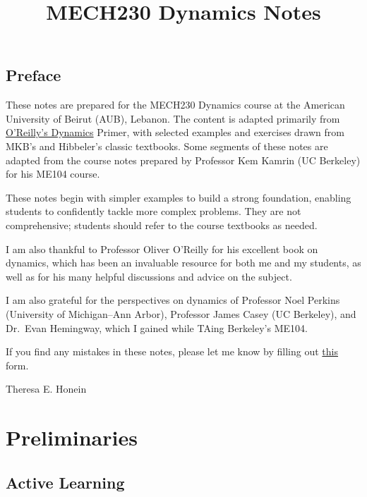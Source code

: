 \documentclass[
  letterpaper,
  DIV=11,
  numbers=noendperiod]{scrreprt}
\title{MECH230 Dynamics Notes}
\author{}
\date{}
\renewcommand*\contentsname{Table of contents}
\newcommand\contentsname{Table of contents}
\begin{document}
\maketitle

\renewcommand*\contentsname{Table of contents}
{
\setcounter{tocdepth}{2}
\tableofcontents
}


\chapter*{Preface}\label{preface}


These notes are prepared for the MECH230 Dynamics course at the American
University of Beirut (AUB), Lebanon. The content is adapted primarily
from
\href{https://link.springer.com/content/pdf/10.1007/978-3-030-11745-0.pdf}{O'Reilly's
Dynamics} Primer, with selected examples and exercises drawn from MKB's
and Hibbeler's classic textbooks. Some segments of these notes are
adapted from the course notes prepared by Professor Kem Kamrin (UC
Berkeley) for his ME104 course.

These notes begin with simpler examples to build a strong foundation,
enabling students to confidently tackle more complex problems. They are
not comprehensive; students should refer to the course textbooks as
needed.

I am also thankful to Professor Oliver O'Reilly for his excellent book
on dynamics, which has been an invaluable resource for both me and my
students, as well as for his many helpful discussions and advice on the
subject.

I am also grateful for the perspectives on dynamics of Professor Noel
Perkins (University of Michigan--Ann Arbor), Professor James Casey (UC
Berkeley), and Dr.~Evan Hemingway, which I gained while TAing Berkeley's
ME104.

If you find any mistakes in these notes, please let me know by filling
out \href{https://forms.gle/McKpRhMq4JejnG8V9}{this} form.

Theresa E. Honein

\part{Preliminaries}

\chapter{Active Learning}\label{active-learning}
\end{document}

